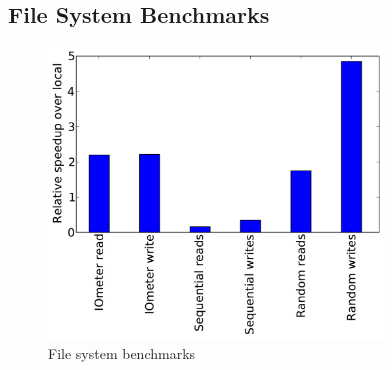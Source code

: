 \subsection{File System Benchmarks}

\begin{figure}
  \centering
   \includegraphics[width=3.5in]{figures/benchmarks.pdf}
   \caption{File system benchmarks }
   \label{fig:checkpointing}
\end{figure}
